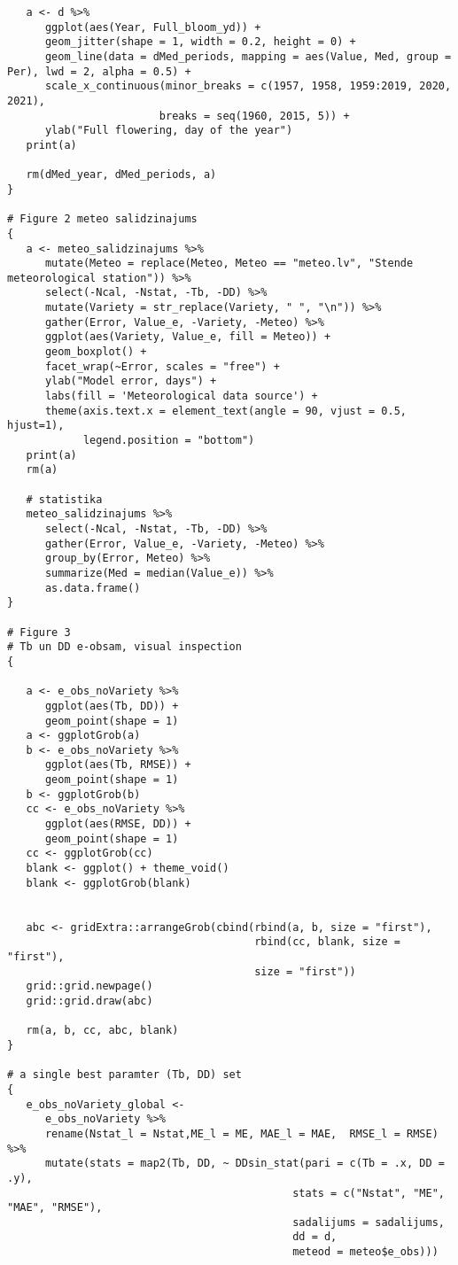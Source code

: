 \begin{verbatim}
   a <- d %>%
      ggplot(aes(Year, Full_bloom_yd)) +
      geom_jitter(shape = 1, width = 0.2, height = 0) +
      geom_line(data = dMed_periods, mapping = aes(Value, Med, group = Per), lwd = 2, alpha = 0.5) +
      scale_x_continuous(minor_breaks = c(1957, 1958, 1959:2019, 2020, 2021),
                        breaks = seq(1960, 2015, 5)) +
      ylab("Full flowering, day of the year")
   print(a)

   rm(dMed_year, dMed_periods, a)
}

# Figure 2 meteo salidzinajums
{
   a <- meteo_salidzinajums %>%
      mutate(Meteo = replace(Meteo, Meteo == "meteo.lv", "Stende meteorological station")) %>%
      select(-Ncal, -Nstat, -Tb, -DD) %>%
      mutate(Variety = str_replace(Variety, " ", "\n")) %>%
      gather(Error, Value_e, -Variety, -Meteo) %>%
      ggplot(aes(Variety, Value_e, fill = Meteo)) +
      geom_boxplot() +
      facet_wrap(~Error, scales = "free") +
      ylab("Model error, days") +
      labs(fill = 'Meteorological data source') +
      theme(axis.text.x = element_text(angle = 90, vjust = 0.5, hjust=1),
            legend.position = "bottom")
   print(a)
   rm(a)

   # statistika
   meteo_salidzinajums %>%
      select(-Ncal, -Nstat, -Tb, -DD) %>%
      gather(Error, Value_e, -Variety, -Meteo) %>%
      group_by(Error, Meteo) %>%
      summarize(Med = median(Value_e)) %>%
      as.data.frame()
}

# Figure 3
# Tb un DD e-obsam, visual inspection
{

   a <- e_obs_noVariety %>%
      ggplot(aes(Tb, DD)) +
      geom_point(shape = 1)
   a <- ggplotGrob(a)
   b <- e_obs_noVariety %>%
      ggplot(aes(Tb, RMSE)) +
      geom_point(shape = 1)
   b <- ggplotGrob(b)
   cc <- e_obs_noVariety %>%
      ggplot(aes(RMSE, DD)) +
      geom_point(shape = 1)
   cc <- ggplotGrob(cc)
   blank <- ggplot() + theme_void()
   blank <- ggplotGrob(blank)


   abc <- gridExtra::arrangeGrob(cbind(rbind(a, b, size = "first"),
                                       rbind(cc, blank, size = "first"),
                                       size = "first"))
   grid::grid.newpage()
   grid::grid.draw(abc)

   rm(a, b, cc, abc, blank)
}

# a single best paramter (Tb, DD) set
{
   e_obs_noVariety_global <-
      e_obs_noVariety %>%
      rename(Nstat_l = Nstat,ME_l = ME, MAE_l = MAE,  RMSE_l = RMSE) %>%
      mutate(stats = map2(Tb, DD, ~ DDsin_stat(pari = c(Tb = .x, DD = .y),
                                             stats = c("Nstat", "ME", "MAE", "RMSE"),
                                             sadalijums = sadalijums,
                                             dd = d,
                                             meteod = meteo$e_obs)))


\end{verbatim}

